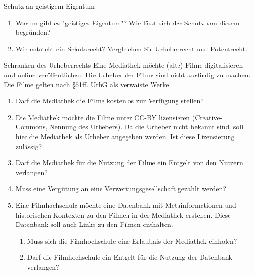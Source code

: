 \documentclass{article}
\begin{document}
\begin{exercise}{Schutz an geistigem Eigentum}
  \begin{enumerate}
    \item Warum gibt es "geistiges Eigentum"? Wie lässt sich der Schutz von diesem begründen?
    \item Wie entsteht ein Schutzrecht? Vergleichen Sie Urheberrecht und Patentrecht.
  \end{enumerate}
\end{exercise}

\begin{exercise}{Schranken des Urheberrechts}
  Eine Mediathek möchte (alte) Filme digitalisieren und online veröffentlichen. Die Urheber der Filme sind nicht ausfindig zu machen. Die Filme gelten nach §61ff. UrhG als verwaiste Werke.
  \begin{enumerate}
    \item Darf die Mediathek die Filme kostenlos zur Verfügung stellen?
    \item Die Mediathek möchte die Filme unter CC-BY lizensieren (Creative-Commons, Nennung des Urhebers). Da die Urheber nicht bekannt sind, soll hier die Mediathek als Urheber angegeben werden. Ist diese Lizensierung zulässig?
    \item Darf die Mediathek für die Nutzung der Filme ein Entgelt von den Nutzern verlangen?
    \item Muss eine Vergütung an eine Verwertungsgesellschaft gezahlt werden?
    \item Eine Filmhochschule möchte eine Datenbank mit Metainformationen und historischen Kontexten zu den Filmen in der Mediathek erstellen. Diese Datenbank soll auch Links zu den Filmen enthalten.
          \begin{enumerate}
            \item Muss sich die Filmhochschule eine Erlaubnis der Mediathek einholen?
            \item Darf die Filmhochschule ein Entgelt für die Nutzung der Datenbank verlangen?
          \end{enumerate}
  \end{enumerate}
\end{exercise}
\end{document}
